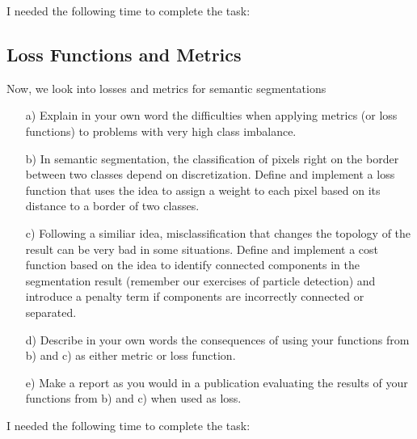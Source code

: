 I needed the following time to complete the task:

\subsection{Loss Functions and Metrics}

Now, we look into losses and metrics for semantic segmentations

\begin{enumerate}
	\item[a)] Explain in your own word the difficulties when applying metrics (or loss functions) to problems with very high class imbalance.
	\item[b)] In semantic segmentation, the classification of pixels right on the border between two classes depend on discretization. Define and implement a loss function that uses the idea to assign a weight to each pixel based on its distance to a border of two classes.
	\item[c)] Following a similiar idea, misclassification that changes the topology of the result can be very bad in some situations. Define and implement a cost function based on the idea to identify connected components in the segmentation result (remember our exercises of particle detection) and introduce a penalty term if components are incorrectly connected or separated.
	\item[d)] Describe in your own words the consequences of using your functions from b) and c)  as either metric or loss function.
	\item[e)] Make a report as you would in a publication evaluating the results of your functions from b) and c) when used as loss. 
\end{enumerate}

I needed the following time to complete the task:

